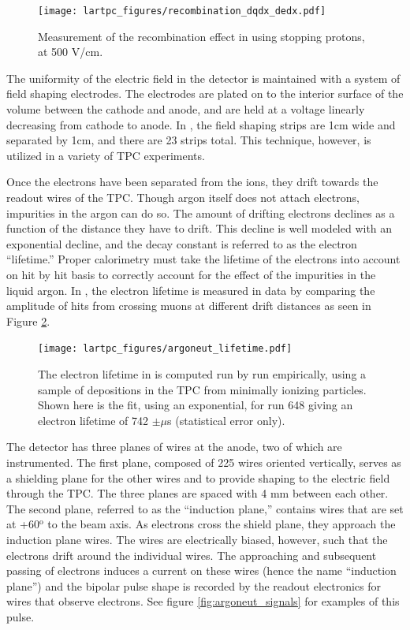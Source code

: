 \begin{figure}[htbp]
  \centering
  \texttt{[image: lartpc\_figures/recombination\_dqdx\_dedx.pdf]}
  \caption[\argoneut Recombination]{Measurement of the recombination effect in \argoneut using stopping protons, at 500 V/cm. \cite{Acciarri:2013met}}
  \label{fig:argoneut_recombination}
\end{figure}

The uniformity of the electric field in the \argoneut detector is maintained with a system of field shaping electrodes.  The electrodes are plated on to the interior surface of the volume between the cathode and anode, and are held at a voltage linearly decreasing from cathode to anode.  In \argoneut, the field shaping strips are 1cm wide and separated by 1cm, and there are 23 strips total.  This technique, however, is utilized in a variety of TPC experiments.

Once the electrons have been separated from the ions, they drift towards the readout wires of the TPC.  Though argon itself does not attach electrons, impurities in the argon can do so.  The amount of drifting electrons declines as a function of the distance they have to drift.  This decline is well modeled with an exponential decline, and the decay constant is referred to as the electron ``lifetime.'' Proper calorimetry must take the lifetime of the electrons into account on hit by hit basis to correctly account for the effect of the impurities in the liquid argon.  In \argoneut, the electron lifetime is measured in data by comparing the amplitude of hits from crossing muons at different drift distances as seen in Figure \ref{fig:argoneut_lifetime}.

\begin{figure}[htbp]
  \centering
  \texttt{[image: lartpc\_figures/argoneut\_lifetime.pdf]}
  \caption[\argoneut Lifetime Measurement]{The electron lifetime in \argoneut is computed run by run empirically, using a sample of depositions in the TPC from minimally ionizing particles.  Shown here is the fit, using an exponential, for run 648 giving an electron lifetime of 742 $\pm \mu$s (statistical error only).}
  \label{fig:argoneut_lifetime}
\end{figure}



The \argoneut detector has three planes of wires at the anode, two of which are instrumented.  The first plane, composed of 225 wires oriented vertically, serves as a shielding plane for the other wires and to provide shaping to the electric field through the TPC.  The three planes are spaced with 4 mm between each other.  The second plane, referred to as the ``induction plane,'' contains wires that are set at +60$^\text{o}$ to the beam axis.  As electrons cross the shield plane, they approach the induction plane wires.  The wires are electrically biased, however, such that the electrons drift around the individual wires.  The approaching and subsequent passing of electrons induces a current on these wires (hence the name ``induction plane'') and the bipolar pulse shape is recorded by the readout electronics for wires that observe electrons.  See figure \ref{fig:argoneut_signals} for examples of this pulse.

